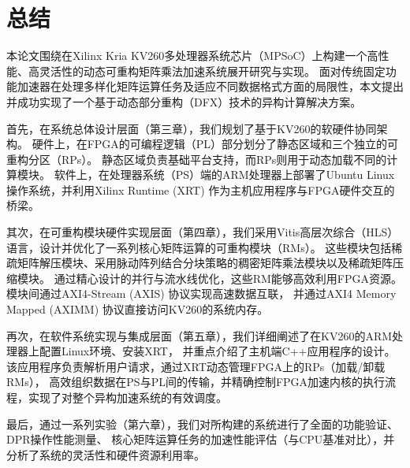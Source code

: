 \chapter{总结}

本论文围绕在Xilinx Kria KV260多处理器系统芯片（MPSoC）上构建一个高性能、高灵活性的动态可重构矩阵乘法加速系统展开研究与实现。
面对传统固定功能加速器在处理多样化矩阵运算任务及适应不同数据格式方面的局限性，本文提出并成功实现了一个基于动态部分重构（DFX）技术的异构计算解决方案。

首先，在系统总体设计层面（第三章），我们规划了基于KV260的软硬件协同架构。
硬件上，在FPGA的可编程逻辑（PL）部分划分了静态区域和三个独立的可重构分区（RPs）。
静态区域负责基础平台支持，而RPs则用于动态加载不同的计算模块。
软件上，在处理器系统（PS）端的ARM处理器上部署了Ubuntu Linux操作系统，并利用Xilinx Runtime (XRT) 作为主机应用程序与FPGA硬件交互的桥梁。

其次，在可重构模块硬件实现层面（第四章），我们采用Vitis高层次综合（HLS）语言，设计并优化了一系列核心矩阵运算的可重构模块（RMs）。
这些模块包括稀疏矩阵解压模块、采用脉动阵列结合分块策略的稠密矩阵乘法模块以及稀疏矩阵压缩模块。
通过精心设计的并行与流水线优化，这些RM能够高效利用FPGA资源。模块间通过AXI4-Stream (AXIS) 协议实现高速数据互联，
并通过AXI4 Memory Mapped (AXIMM) 协议直接访问KV260的系统内存。

再次，在软件系统实现与集成层面（第五章），我们详细阐述了在KV260的ARM处理器上配置Linux环境、安装XRT，
并重点介绍了主机端C++应用程序的设计。该应用程序负责解析用户请求，通过XRT动态管理FPGA上的RPs（加载/卸载RMs），
高效组织数据在PS与PL间的传输，并精确控制FPGA加速内核的执行流程，实现了对整个异构加速系统的有效调度。

最后，通过一系列实验（第六章），我们对所构建的系统进行了全面的功能验证、DPR操作性能测量、
核心矩阵运算任务的加速性能评估（与CPU基准对比），并分析了系统的灵活性和硬件资源利用率。
